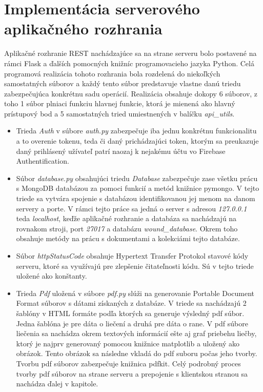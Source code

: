 \section{Implementácia serverového aplikačného rozhrania}
Aplikačné rozhranie REST nachádzajúce sa na strane serveru bolo postavené na rámci Flask a ďalších pomocných knižníc programovacieho jazyka Python. Celá programová realizácia tohoto rozhrania bola rozdelená do niekoľkých samostatných súborov a každý tento súbor predstavuje vlastne danú triedu zabezpečujúca konkrétnu sadu operácií. Realizácia obsahuje dokopy 6 súborov, z toho 1 súbor plniaci funkciu hlavnej funkcie, ktorá je mienená ako hlavný prístupový bod a 5 samostatných tried umiestnených v balíčku \textit{api\_utils}.
\begin{itemize}
\item Trieda \textit{Auth} v súbore \textit{auth.py} zabezpečuje iba jednu konkrétnu funkcionalitu a to overenie tokenu, teda či daný prichádzajúci token, ktorým sa preukazuje daný prihlásený užívateľ patrí naozaj k nejakému účtu vo Firebase Authentification.

\item Súbor \textit{database.py} obsahujúci triedu \textit{Database} zabezpečuje zase všetku prácu s MongoDB databázou za pomoci funkcií a metód knižnice pymongo. V tejto triede sa vytvára spojenie s databázou identifikovanou jej menom na danom servery a porte. V rámci tejto práce sa jedná o server s adresou \textit{127.0.0.1} teda \textit{localhost}, keďže aplikačné rozhranie a databáza sa nachádzajú na rovnakom stroji, port \textit{27017} a databázu \textit{wound\_database}. Okrem toho obsahuje metódy na prácu s dokumentami a kolekciámi tejto databáze.

\item Súbor \textit{httpStatusCode} obsahuje Hypertext Transfer Protokol stavové kódy serveru, ktoré sa využívajú pre zlepšenie čitateľnosti kódu. Sú v tejto triede uložené ako konštanty.

\item Trieda \textit{Pdf} uložená v súbore \textit{pdf.py} slúži na generovanie Portable Document Format súborov s dátami získaných z databáze. V triede sa nachádzajú 2 šablóny v HTML  formáte podľa ktorých sa generuje výsledný pdf súbor. Jedna šablóna je pre dáta o liečení a druhá pre dáta o rane. V pdf súbore liečenia sa nachádza okrem textových informácií ešte aj graf priebehu liečby, ktorý je najprv generovaný pomocou knižnice matplotlib a uložený ako obrázok. Tento obrázok sa následne vkladá do pdf suboru počas jeho tvorby. Tvorbu pdf súborov zabezpečuje knižnica pdfkit. Celý podrobný proces tvorby pdf súborov na strane serveru a prepojenie s klientskou stranou sa nachádza ďalej v kapitole.


\end{itemize}
